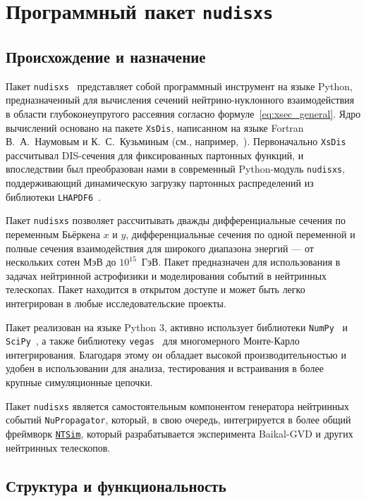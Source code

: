 \section{Программный пакет \texttt{nudisxs}}

\subsection{Происхождение и назначение}

Пакет \texttt{nudisxs}~\cite{nudisxs2022} представляет собой программный инструмент на языке Python, предназначенный для вычисления сечений нейтрино-нуклонного взаимодействия в области глубоконеупругого рассеяния согласно формуле~\eqref{eq:xsec_general}. Ядро вычислений основано на пакете \texttt{XsDis}, написанном на языке Fortran В.~А.~Наумовым и К.~С.~Кузьминым (см., например,~\cite{KuzminNaumov2003}). Первоначально \texttt{XsDis} рассчитывал DIS-сечения для фиксированных партонных функций, и впоследствии был преобразован нами в современный Python-модуль \texttt{nudisxs}, поддерживающий динамическую загрузку партонных распределений из библиотеки \texttt{LHAPDF6}~\cite{aartsenLHAPDF2020}.

Пакет \texttt{nudisxs} позволяет рассчитывать дважды дифференциальные сечения по переменным Бьёркена $x$ и $y$, дифференциальные сечения по одной переменной и полные сечения взаимодействия для широкого диапазона энергий — от нескольких сотен МэВ до $10^{15}$~ГэВ. Пакет предназначен для использования в задачах нейтринной астрофизики и моделирования событий в нейтринных телескопах. Пакет находится в открытом доступе и может быть легко интегрирован в любые исследовательские проекты.


Пакет реализован на языке Python 3, активно использует библиотеки \texttt{NumPy}~\cite{2020NumPy-Array} и \texttt{SciPy}~\cite{2020SciPy-NMeth}, а также библиотеку \texttt{vegas}~\cite{lepageVegas2021} для многомерного Монте-Карло интегрирования. Благодаря этому он обладает высокой производительностью и удобен в использовании для анализа, тестирования и встраивания в более крупные симуляционные цепочки.

Пакет \texttt{nudisxs} является самостоятельным компонентом генератора нейтринных событий \texttt{NuPropagator}, который, в свою очередь, интегрируется в более общий фреймворк \href{https://pypi.org/project/ntsim/}{\texttt{NTSim}}, который разрабатывается эксперимента Baikal-GVD и других нейтринных телескопов.

\subsection{Структура и функциональность}

